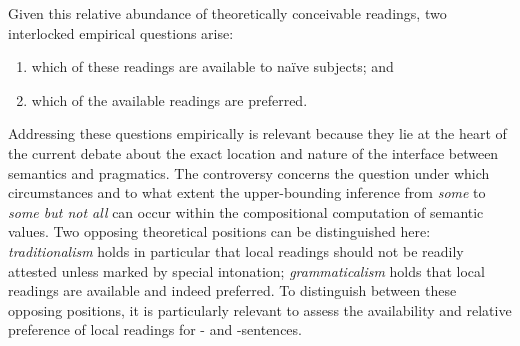 \documentclass[fleqn,reqno,10pt,draft]{article}
\newcommand{\as}{\acro{as}}
\renewcommand{\es}{\acro{es}}
\begin{document}
\noindent Given this relative abundance of theoretically conceivable
readings, two interlocked empirical questions arise:
\begin{enumerate}[Q1:]
\item which of these readings are available to na\"{i}ve subjects; and
\item which of the available readings are preferred.
\end{enumerate}
Addressing these questions empirically is relevant because they lie at
the heart of the current debate about the exact location and nature of
the interface between semantics and pragmatics. The controversy
concerns the question under which circumstances and to what extent the
upper-bounding inference from \emph{some} to \emph{some but not all}
can occur within the compositional computation of semantic values. Two
opposing theoretical positions can be distinguished here:
\emph{traditionalism} holds in particular that local readings should
not be readily attested unless marked by special intonation;
\emph{grammaticalism} holds that local readings are available and
indeed preferred. To distinguish between these opposing positions, it
is particularly relevant to assess the availability and relative
preference of local readings for \as- and
\es-sentences. %

\end{document}
